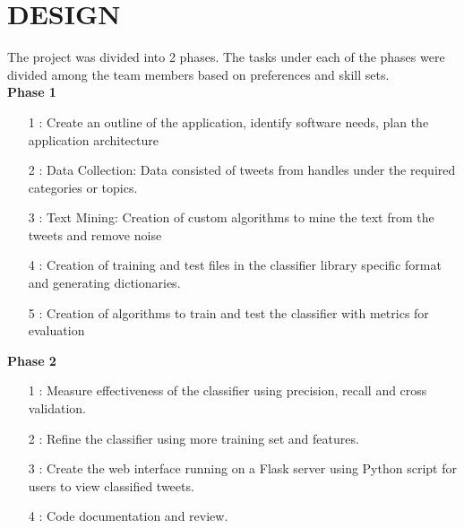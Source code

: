 \chapter{DESIGN}

The project was divided into 2 phases. The tasks under each of the phases were divided among the team members based on preferences and skill sets.
\\

\textbf{Phase 1}
\vspace{0.1cm}
\begin{itemize}
	\item[1 :]{Create an outline of the application, identify software needs, plan the application architecture}
	\item[2 :]{ Data Collection: Data consisted of tweets from 
	handles under the required categories or topics.}
	\item[3 :]{Text Mining: Creation of custom algorithms to mine the text from the tweets and remove noise}
	\item[4 :]{Creation of training and test files in the classifier library specific format and generating dictionaries.}
	\item[5 :]{Creation of algorithms to train and test the classifier with metrics for evaluation}
\end{itemize}

\textbf{Phase 2}
\vspace{0.1cm}
\begin{itemize}
	\item[1 :]{Measure effectiveness of the classifier using precision, recall and cross validation.}
	\item[2 :]{Refine the classifier using more training set and features.}
	\item[3 :]{Create the web interface running on a Flask server using Python script for users to view classified
tweets.}
	\item[4 :]{Code documentation and review.}

\end{itemize}
